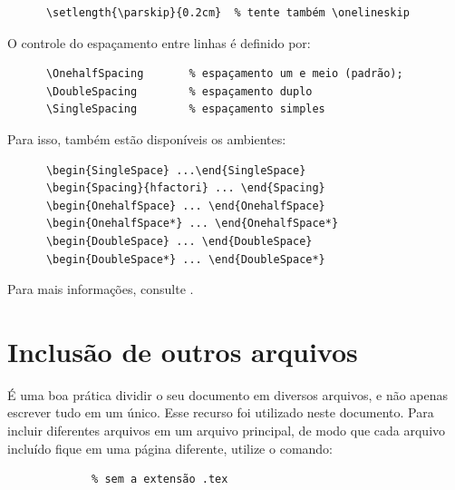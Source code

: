     \begin{verbatim}
      \setlength{\parskip}{0.2cm}  % tente também \onelineskip
    \end{verbatim}

    O controle do espaçamento entre linhas é
    definido por:

    \begin{verbatim}
      \OnehalfSpacing       % espaçamento um e meio (padrão);
      \DoubleSpacing        % espaçamento duplo
      \SingleSpacing        % espaçamento simples
    \end{verbatim}

    Para isso, também estão disponíveis os ambientes:

    \begin{verbatim}
      \begin{SingleSpace} ...\end{SingleSpace}
      \begin{Spacing}{hfactori} ... \end{Spacing}
      \begin{OnehalfSpace} ... \end{OnehalfSpace}
      \begin{OnehalfSpace*} ... \end{OnehalfSpace*}
      \begin{DoubleSpace} ... \end{DoubleSpace}
      \begin{DoubleSpace*} ... \end{DoubleSpace*}
    \end{verbatim}

    Para mais informações, consulte .

    \section{Inclusão de outros arquivos}\label{sec-include}

    É uma boa prática dividir o seu documento em diversos arquivos, e não
    apenas escrever tudo em um único. Esse recurso foi utilizado neste
    documento. Para incluir diferentes arquivos em um arquivo principal,
    de modo que cada arquivo incluído fique em uma página diferente, utilize o
    comando:

    \begin{verbatim}
             % sem a extensão .tex
    \end{verbatim}

